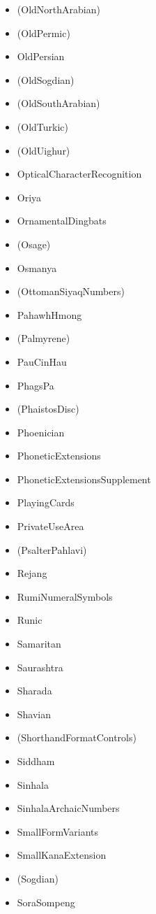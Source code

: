 \documentclass{article}
\newenvironment{itemlist}{%
  \begin{itemize}
  \setlength{\itemsep}{0pt}
  \setlength{\parsep}{0pt}
  \setlength{\topsep}{0pt}
  \setlength{\partopsep}{0pt}
  \setlength{\parskip}{0pt}
  \setlength{\labelsep}{5pt}}%
{
  \end{itemize}}
\begin{document}
\begin{multicols*}{2}
\begin{itemlist}
        \item (OldNorthArabian)
        \item (OldPermic)
        \item OldPersian
        \item (OldSogdian)
        \item (OldSouthArabian)
        \item (OldTurkic)
        \item (OldUighur)
        \item OpticalCharacterRecognition
        \item Oriya
        \item OrnamentalDingbats
        \item (Osage)
        \item Osmanya
        \item (OttomanSiyaqNumbers)
        \item PahawhHmong
        \item (Palmyrene)
        \item PauCinHau
        \item PhagsPa
        \item (PhaistosDisc)
        \item Phoenician
        \item PhoneticExtensions
        \item PhoneticExtensionsSupplement
        \item PlayingCards
        \item PrivateUseArea
        \item (PsalterPahlavi)
        \item Rejang
        \item RumiNumeralSymbols
        \item Runic
        \item Samaritan
        \item Saurashtra
        \item Sharada
        \item Shavian
        \item (ShorthandFormatControls)
        \item Siddham
        \item Sinhala
        \item SinhalaArchaicNumbers
        \item SmallFormVariants
        \item SmallKanaExtension
        \item (Sogdian)
        \item SoraSompeng

\end{itemlist}
\end{multicols*}
\end{document}
